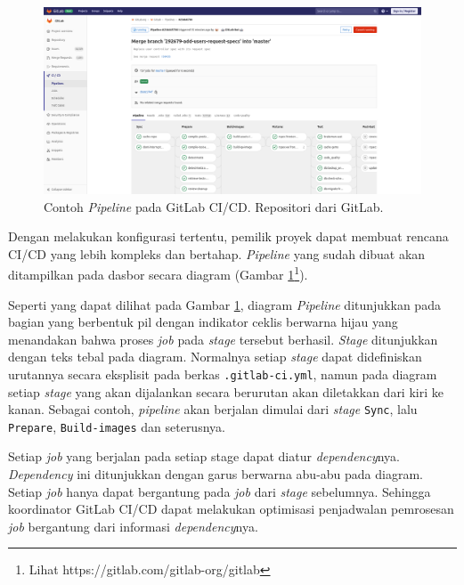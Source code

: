     
    \begin{figure}
        \centering
        \includegraphics[width=0.7\paperwidth]{Gambar/gitlab-ci-pipeline.png}
        \caption{Contoh \textit{Pipeline} pada GitLab CI/CD. Repositori dari
        GitLab.}
        \label{fig:gitlab-ci:pipeline}
    \end{figure}
    
    Dengan melakukan konfigurasi tertentu, pemilik proyek dapat membuat rencana
    CI/CD yang lebih kompleks dan bertahap. \textit{Pipeline} yang sudah dibuat
    akan ditampilkan pada dasbor secara diagram (Gambar
    \ref{fig:gitlab-ci:pipeline}\footnote{Lihat https://gitlab.com/gitlab-org/gitlab}).
    
    Seperti yang dapat dilihat pada Gambar
    \ref{fig:gitlab-ci:pipeline},
    diagram \textit{Pipeline} ditunjukkan pada bagian yang berbentuk pil dengan indikator ceklis
    berwarna hijau yang menandakan bahwa proses \textit{job} pada \textit{stage} tersebut berhasil.
    \textit{Stage} ditunjukkan dengan teks tebal pada diagram. Normalnya setiap \textit{stage} dapat
    didefiniskan urutannya secara eksplisit pada berkas \texttt{.gitlab-ci.yml}, namun pada diagram
    setiap \textit{stage} yang akan dijalankan secara berurutan akan diletakkan dari kiri ke kanan.
    Sebagai contoh, \textit{pipeline} akan berjalan dimulai dari \textit{stage} \texttt{Sync}, lalu 
    \texttt{Prepare}, \texttt{Build-images} dan seterusnya.
    
    Setiap \textit{job} yang berjalan pada setiap stage dapat diatur \textit{dependency}nya. 
    \textit{Dependency} ini ditunjukkan dengan garus berwarna abu-abu pada diagram. Setiap \textit{job}
    hanya dapat bergantung pada \textit{job} dari \textit{stage} sebelumnya. Sehingga koordinator
    GitLab CI/CD dapat melakukan optimisasi penjadwalan pemrosesan \textit{job} bergantung dari
    informasi \textit{dependency}nya.


